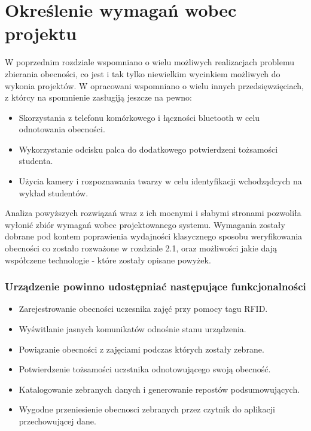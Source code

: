 \documentclass[declaration,shortabstract, mgr]{iithesis}
\begin{document}
\section{Określenie wymagań wobec projektu}
\indent W poprzednim rozdziale wspomniano o wielu możliwych realizacjach problemu zbierania obecności, co jest i tak tylko niewielkim wycinkiem możliwych do wykonia projektów. W opracowani \cite{review} wspomniano o wielu innych przedsięwzięciach, z którcy na spomnienie zasługiją jeszcze na pewno:

\begin{itemize}
\item Skorzystania z telefonu komórkowego i łączności bluetooth w celu odnotowania obecności.
\item Wykorzystanie odcisku palca do dodatkowego potwierdzeni tożsamości studenta.
\item Użycia kamery i rozpoznawania twarzy w celu identyfikacji wchodządcych na wykład studentów.
\end{itemize}

\indent Analiza powyższych rozwiązań wraz z ich mocnymi i słabymi stronami pozwoliła wyłonić zbiór wymagań wobec projektowanego systemu. Wymagania zostały dobrane pod kontem poprawienia wydajności klasycznego sposobu weryfikowania obecności co zostało rozważone w rozdziale 2.1, oraz możliwości jakie dają współczene technologie - które zostały opisane powyżek.

\subsubsection{Urządzenie powinno udostępniać następujące funkcjonalności}

\begin{itemize}
\item Zarejestrowanie obecności uczesnika zajęć przy pomocy tagu RFID.
\item Wyświtlanie jasnych komunikatów odnośnie stanu urządzenia.
\item Powiązanie obecności z zajęciami podczas których zostały zebrane.
\item Potwierdzenie tożsamości uczstnika odnotowującego swoją obecność.
\item Katalogowanie zebranych danych i generowanie repostów podsumowujących.
\item Wygodne przeniesienie obecnosci zebranych przez czytnik do aplikacji przechowującej dane.
\end{itemize}
\end{document}
